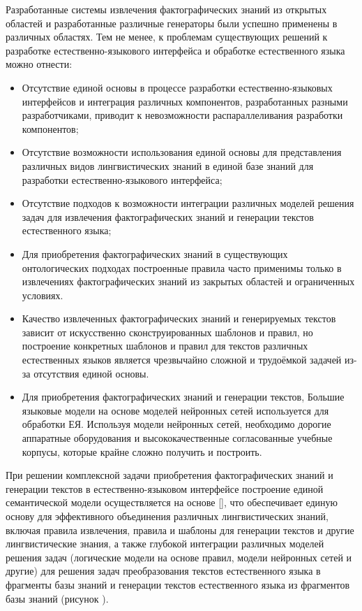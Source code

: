 Разработанные системы извлечения фактографических знаний из открытых областей и разработанные различные генераторы были успешно применены в различных областях. Тем не менее, к проблемам существующих решений к разработке естественно-языкового интерфейса и обработке естественного языка можно отнести:
\begin{itemize}
	\item Отсутствие единой основы в процессе разработки естественно-языковых интерфейсов и интеграция различных компонентов, разработанных разными разработчиками, приводит к невозможности распараллеливания разработки компонентов;
	\item Отсутствие возможности использования единой основы для представления различных видов лингвистических знаний в единой базе знаний для разработки естественно-языкового интерфейса;
	\item Отсутствие подходов к возможности интеграции различных моделей решения задач для извлечения фактографических знаний и генерации текстов естественного языка;
	\item Для приобретения фактографических знаний в существующих онтологических подходах построенные правила часто применимы только в извлечениях фактографических знаний из закрытых областей и ограниченных условиях.
	\item Качество извлеченных фактографических знаний и генерируемых текстов зависит от искусственно сконструированных шаблонов и правил, но построение конкретных шаблонов и правил для текстов различных естественных языков является чрезвычайно сложной и трудоёмкой задачей из-за отсутствия единой основы.
	\item Для приобретения фактографических знаний и генерации текстов, Большие языковые модели на основе моделей нейронных сетей
	используется для обработки ЕЯ. Используя модели нейронных сетей, необходимо дорогие аппаратные оборудования и высококачественные согласованные учебные корпусы, которые  крайне сложно получить и построить.
\end{itemize}

При решении комплексной задачи приобретения фактографических знаний и генерации текстов в естественно-языковом интерфейсе построение единой семантической модели осуществляется на основе  [], что обеспечивает единую основу для эффективного объединения различных лингвистических знаний, включая правила извлечения, правила и шаблоны для генерации текстов и другие лингвистические знания, а также глубокой интеграции различных моделей решения задач (логические модели на основе правил, модели нейронных сетей и другие) для решения задач преобразования текстов естественного языка в фрагменты базы знаний и генерации текстов естественного языка из фрагментов базы знаний (рисунок \textit{}). 

